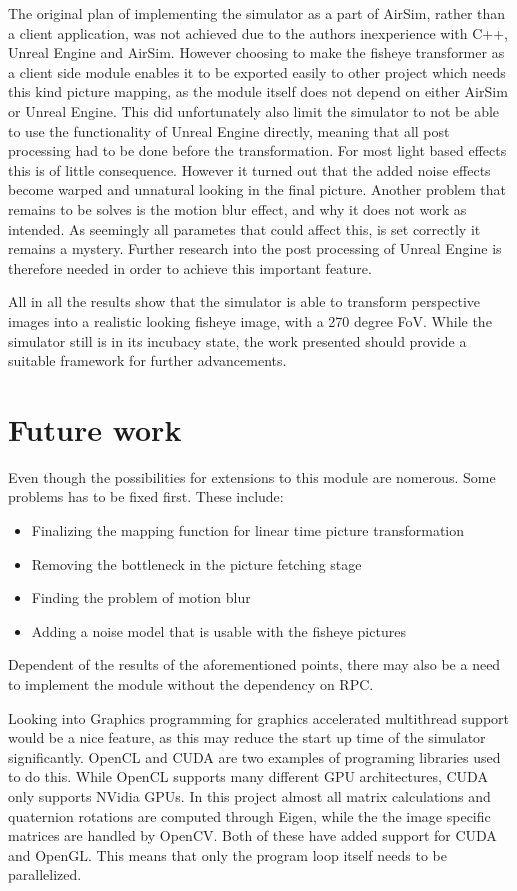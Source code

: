 The original plan of implementing the simulator as a part of AirSim, rather than a client application, was not achieved due to the authors inexperience with C++, Unreal Engine and AirSim. However choosing to make the fisheye transformer as a client side module enables it to be exported easily to other project which needs this kind picture mapping, as the module itself does not depend on either AirSim or Unreal Engine. This did unfortunately also limit the simulator to not be able to use the functionality of Unreal Engine directly, meaning that all post processing had to be done before the transformation. For most light based effects this is of little consequence. However it turned out that the added noise effects become warped and unnatural looking in the final picture. Another problem that remains to be solves is the motion blur effect, and why it does not work as intended. As seemingly all parametes that could affect this, is set correctly it remains a mystery. Further research into the post processing of Unreal Engine is therefore needed in order to achieve this important feature. 

All in all the results show that the simulator is able to transform perspective images into a realistic looking fisheye image, with a 270 degree FoV. While the simulator still is in its incubacy state, the work presented should provide a suitable framework for further advancements.

\section{Future work}

Even though the possibilities for extensions to this module are nomerous. Some problems has to be fixed first. These include:
\begin{itemize}
    \item Finalizing the mapping function for linear time picture transformation
    \item Removing the bottleneck in the picture fetching stage
    \item Finding the problem of motion blur
    \item Adding a noise model that is usable with the fisheye pictures
\end{itemize}

Dependent of the results of the aforementioned points, there may also be a need to implement the module without the dependency on RPC.

Looking into Graphics programming for graphics accelerated multithread support would be a nice feature, as this may reduce the start up time of the simulator significantly. OpenCL and CUDA are two examples of programing libraries used to do this. While OpenCL supports many different GPU architectures, CUDA only supports NVidia GPUs. In this project almost all matrix calculations and quaternion rotations are computed through Eigen, while the the image specific matrices are handled by OpenCV. Both of these have added support for CUDA and OpenGL. This means that only the program loop itself needs to be parallelized.


